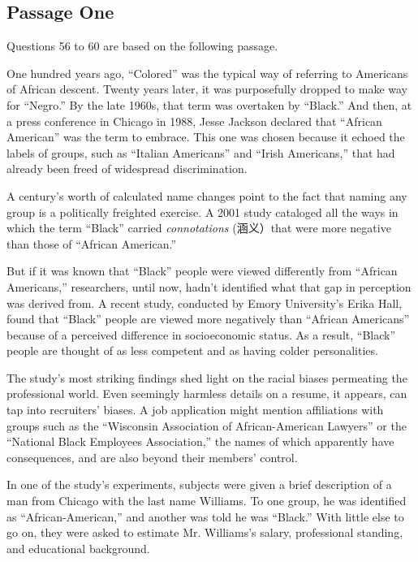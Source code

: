 \documentclass[UTF8,11pt]{ctexart}
\begin{document}
\subsection*{\textbf{Passage One}}


Questions 56 to 60 are based on the following passage.


One hundred years ago, “Colored” was the typical way of referring to Americans of African descent. Twenty years later, it was purposefully dropped to make way for “Negro.” By the late 1960s, that term was overtaken by “Black.” And then, at a press conference in Chicago in 1988, Jesse Jackson declared that “African American” was the term to embrace. This one was chosen because it echoed the labels of groups, such as “Italian Americans” and “Irish Americans,” that had already been freed of widespread discrimination.


A century’s worth of calculated name changes point to the fact that naming any group is a politically freighted exercise. A 2001 study cataloged all the ways in which the term “Black” carried\textit{ connotations} (涵义）that were more negative than those of “African American.”


But if it was known that “Black” people were viewed differently from “African Americans,” researchers, until now, hadn’t identified what that gap in perception was derived from. A recent study, conducted by Emory University’s Erika Hall, found that “Black” people are viewed more negatively than “African Americans” because of a perceived difference in socioeconomic status. As a result, “Black” people are thought of as less competent and as having colder personalities.


The study’s most striking findings shed light on the racial biases permeating the professional world. Even seemingly harmless details on a resume, it appears, can tap into recruiters’ biases. A job application might mention affiliations with groups such as the “Wisconsin Association of African-American Lawyers” or the “National Black Employees Association,” the names of which apparently have consequences, and are also beyond their members’ control.


In one of the study’s experiments, subjects were given a brief description of a man from Chicago with the last name Williams. To one group, he was identified as “African-American,” and another was told he was “Black.” With little else to go on, they were asked to estimate Mr. Williams’s salary, professional standing, and educational background.
\end{document}
